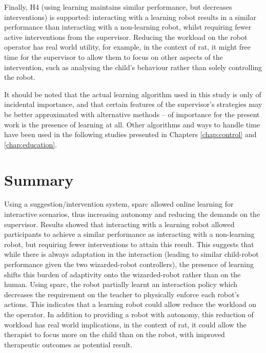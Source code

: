 Finally, H4 (using learning maintains similar performance, but decreases interventions) is supported: interacting with a learning robot results in a similar performance than interacting with a non-learning robot, whilst requiring fewer active interventions from the supervisor. Reducing the workload on the robot operator has real world utility, for example, in the context of \gls{rat}, it might free time for the supervisor to allow them to focus on other aspects of the intervention, such as analysing the child's behaviour rather than solely controlling the robot. 

It should be noted that the actual learning algorithm used in this study is only of incidental importance, and that certain features of the supervisor's strategies may be better approximated with alternative methods -- of importance for the present work is the presence of learning at all. Other algorithms and ways to handle time have been used in the following studies presented in Chapters \ref{chap:control} and \ref{chap:education}.

\section{Summary}


Using a suggestion/intervention system, \gls{sparc} allowed online learning for interactive scenarios, thus increasing autonomy and reducing the demands on the supervisor. Results showed that interacting with a learning robot allowed participants to achieve a similar performance as interacting with a non-learning robot, but requiring fewer interventions to attain this result. This suggests that while there is always adaptation in the interaction (leading to similar child-robot performance given the two wizarded-robot controllers), the presence of learning shifts this burden of adaptivity onto the wizarded-robot rather than on the human. Using \gls{sparc}, the robot partially learnt an interaction policy which decreases the requirement on the teacher to physically enforce each robot's actions. This indicates that a learning robot could allow reduce the workload on the operator. In addition to providing a robot with autonomy, this reduction of workload has real world implications, in the context of \gls{rat}, it could allow the therapist to focus more on the child than on the robot, with improved therapeutic outcomes as potential result. 

